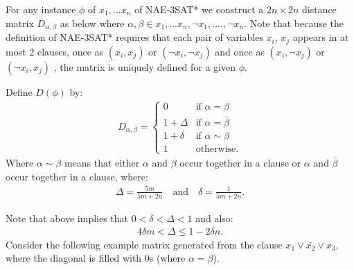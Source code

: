 For any instance $\phi$ of $x_1,...x_n$ of NAE-3SAT* we construct a
$2n \times 2n$ distance matrix $D_{\alpha,\beta}$ as below where
$\alpha,\beta \in x_1,...x_n, \neg x_1,....,\neg x_n$.  Note that
because the definition of NAE-3SAT* requires that each pair of
variables $x_i$, $x_j$ appears in at most 2 clauses, once as
$(x_i,x_j)$ or $(\neg x_i, \neg x_j)$ and once as  $(x_i,\neg x_j)$ or
$(\neg x_i, x_j)$ , the matrix is uniquely defined for a given
$\phi$. 
\begin{definition} \label{2-means-distance-matrix} Define
  $D(\phi)$ by:
\begin{align}
  D_{\alpha,\beta} = \begin{cases}
    0 & \textrm{if } \alpha = \beta\\
    1+\Delta  & \mbox{if } \alpha = \overline{\beta} \\
    1+\delta  & \mbox{if } \alpha \sim \beta \\
    1 & \textrm{otherwise}.
  \end{cases}
\end{align}
Where $ \alpha \sim \beta$ means that either $\alpha$ and $\beta$
occur together in a clause or $\alpha$ and $\overline{\beta} $ occur
together in a clause, where:
\begin{align}
  \Delta = \frac{5m}{5m + 2n} \quad\textrm{and}
  \quad\delta = \frac{1}{5m  + 2n}.
\end{align}
\end{definition}
Note that above implies that $0 < \delta < \Delta < 1$ and also:
\begin{align}
4 \delta m < \Delta \le 1 - 2 \delta n.
\end{align}
Consider the following example matrix generated from the clause $x_1 \vee \bar{x_2} \vee x_3$, where the diagonal is filled with 0s (where $\alpha=\beta$).

